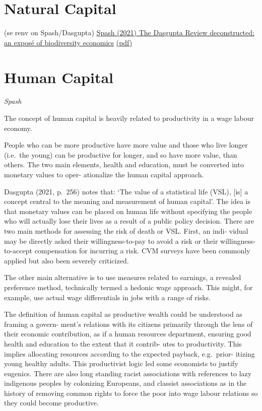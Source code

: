 \documentclass[
]{book}
\begin{document}
\hypertarget{natural-capital}{%
\section{Natural Capital}\label{natural-capital}}

(se renv on Spash/Dasgupta)
\href{https://www.tandf\%20online.com/doi/full/10.1080/14747731.2021.1929007}{Spash (2021) The Dasgupta Review deconstructed: an exposé of biodiversity economics}
\href{pdf/Spash_2021_Dasgupta_Deconstructed.pdf}{(pdf)}

\hypertarget{human-capital}{%
\section{Human Capital}\label{human-capital}}

\emph{Spash}

The concept of human capital is heavily related to productivity in a wage labour economy.

People who can be more productive have more value and those who live longer (i.e.~the young) can
be productive for longer, and so have more value, than others.
The two main elements, health and education, must be converted into monetary values to oper-
ationalize the human capital approach.

Dasgupta (2021, p.~256) notes that: `The value of a statistical life (VSL), {[}is{]} a concept central to
the meaning and measurement of human capital'. The idea is that monetary values can be placed on
human life without specifying the people who will actually lose their lives as a result of a public
policy decision. There are two main methods for assessing the risk of death or VSL. First, an indi-
vidual may be directly asked their willingness-to-pay to avoid a risk or their willingness-to-accept
compensation for incurring a risk. CVM surveys have been commonly applied but also been
severely criticized.

The other main alternative is to use measures
related to earnings, a revealed preference method, technically termed a hedonic wage approach.
This might, for example, use actual wage differentials in jobs with a range of risks.

The definition of human capital as productive wealth could be understood as framing a govern-
ment's relations with its citizens primarily through the lens of their economic contribution, as if
a human resources department, ensuring good health and education to the extent that it contrib-
utes to productivity. This implies allocating resources according to the expected payback, e.g.~prior-
itizing young healthy adults. This productivist logic led some economists to justify eugenics.
There are also long standing racist associations with references to lazy indigenous
peoples by colonizing Europeans, and classist associations as in the history of removing common
rights to force the poor into wage labour relations so they could become productive.
\end{document}
